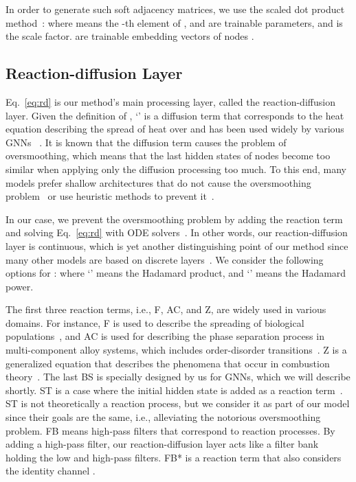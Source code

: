 \documentclass{article}
\theoremstyle{plain}
\theoremstyle{definition}
\theoremstyle{remark}
\begin{document}
In order to generate such soft adjacency matrices, we use the scaled dot product method~\cite{vaswani2017attention}:
where  means the -th element of ,  and  are trainable parameters, and  is the scale factor.  are trainable embedding vectors of nodes .

\subsection{Reaction-diffusion Layer}
Eq.~\eqref{eq:rd} is our method's main processing layer, called the reaction-diffusion layer. Given the definition of , `' is a diffusion term that corresponds to the heat equation describing the spread of heat over  and has been used widely by various GNNs ~\cite{wang2021dgc,choi2021ltocf,chamberlain2021grand}. It is known that the diffusion term causes the problem of oversmoothing, which means that the last hidden states of nodes become too similar when applying only the diffusion processing too much. To this end, many models prefer shallow architectures that do not cause the oversmoothing problem~\cite{Wu2019SGC,kipf2017GCN} or use heuristic methods to prevent it~\cite{zhao2020pairnorm,Chen2018FastGCN,chen2020gcnii,li2019deepgcns,liu2020towards,huang2018adaptivesample,chen2018stochastictraining}.

In our case, we prevent the oversmoothing problem by adding the reaction term  and solving Eq.~\eqref{eq:rd} with ODE solvers~\cite{dormand1980dopri}. In other words, our reaction-diffusion layer is continuous, which is yet another distinguishing point of our method since many other models are based on discrete layers~\cite{kipf2017GCN,Bo2021fagcn,chien2021GPRGNN,zhu2020h2gcn,hamilton2017graphSAGE}. We consider the following options for :
\begingroup\makeatletter\def\f@size{9}\check@mathfonts
\def\maketag@@@#1{\hbox{\m@th\small\normalfont#1}}\endgroup where `' means the Hadamard product, and `' means the Hadamard power.

The first three reaction terms, i.e., F, AC, and Z, are widely used in various domains. For instance, F is used to describe the spreading of biological populations~\cite{fisher1937wave}, and AC is used for describing the phase separation process in multi-component alloy systems, which includes order-disorder transitions~\cite{allen1979microscopic}. Z is a generalized equation that describes the phenomena that occur in combustion theory~\cite{gilding2004travelling}. The last BS is specially designed by us for GNNs, which we will describe shortly. ST is a case where the initial hidden state is added as a reaction term~\cite{xhonneux2019CGNN}. ST is not theoretically a reaction process, but we consider it as part of our model since their goals are the same, i.e., alleviating the notorious oversmoothing problem. FB means high-pass filters that correspond to reaction processes. By adding a high-pass filter, our reaction-diffusion layer acts like a filter bank holding the low and high-pass filters. FB* is a reaction term that also considers the identity channel . 
\end{document}
